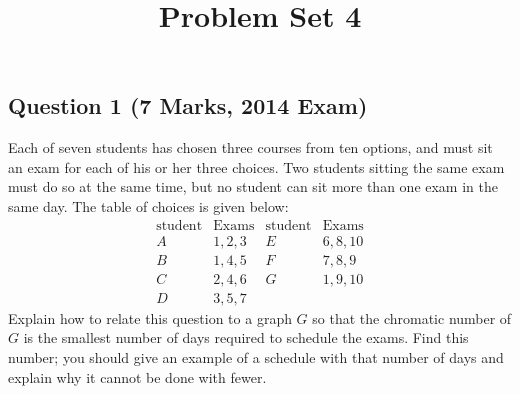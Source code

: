 \documentclass{amsart}
\title{Problem Set 4}
\begin{document}
\maketitle
\subsection*{Question 1 (7 Marks, 2014 Exam)}

Each of seven students has chosen three courses from ten options, and must sit an exam for each of his or her three choices.  Two students sitting the same exam must do so at the same time, but no student can sit more than one exam in the same day.  The table of choices is given below:$$\begin{array}{cc|cc}
\text{student} & \text{Exams} & \text{student} & \text{Exams}  \\
A & 1,2,3 & E & 6,8,10 \\
B & 1,4,5 & F & 7,8,9 \\
C & 2,4,6 & G & 1,9,10 \\
D & 3,5,7 & &
\end{array}$$ Explain how to relate this question to a graph $G$ so that the chromatic number of $G$ is the smallest number of days required to schedule the exams.  Find this number; you should give an example of a schedule with that number of days and explain why it cannot be done with fewer.
\end{document}
